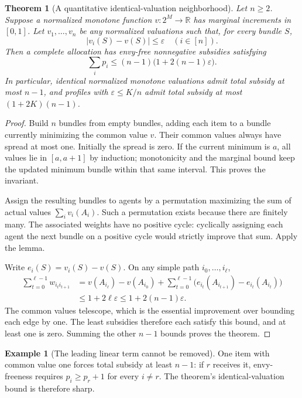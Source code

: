 \documentclass[11pt]{article}
\newtheorem{theorem}{Theorem}
\theoremstyle{definition}
\newtheorem{example}{Example}
\theoremstyle{remark}
\begin{document}
\begin{theorem}[A quantitative identical-valuation neighborhood]
Let $n\geq2$. Suppose a normalized monotone function $v:2^M\to\mathbb R$ has marginal increments in $[0,1]$. Let $v_1,\ldots,v_n$ be any normalized valuations such that, for every bundle $S$,
\[
 |v_i(S)-v(S)|\leq\varepsilon\quad(i\in[n]).
\]
Then a complete allocation has envy-free nonnegative subsidies satisfying
\[
 \sum_i p_i\leq(n-1)\bigl(1+2(n-1)\varepsilon\bigr).
\]
In particular, identical normalized monotone valuations admit total subsidy at most $n-1$, and profiles with $\varepsilon\leq K/n$ admit total subsidy at most $(1+2K)(n-1)$.
\end{theorem}
\begin{proof}
Build $n$ bundles from empty bundles, adding each item to a bundle currently minimizing the common value $v$. Their common values always have spread at most one. Initially the spread is zero. If the current minimum is $a$, all values lie in $[a,a+1]$ by induction; monotonicity and the marginal bound keep the updated minimum bundle within that same interval. This proves the invariant.

Assign the resulting bundles to agents by a permutation maximizing the sum of actual values $\sum_i v_i(A_i)$. Such a permutation exists because there are finitely many. The associated weights have no positive cycle: cyclically assigning each agent the next bundle on a positive cycle would strictly improve that sum. Apply the lemma.

Write $e_i(S)=v_i(S)-v(S)$. On any simple path $i_0,\ldots,i_\ell$,
\begin{align*}
 \sum_{t=0}^{\ell-1}w_{i_t i_{t+1}}
 &=v(A_{i_\ell})-v(A_{i_0})
   +\sum_{t=0}^{\ell-1}\bigl(e_{i_t}(A_{i_{t+1}})-e_{i_t}(A_{i_t})\bigr)\\
 &\leq1+2\ell\varepsilon\leq1+2(n-1)\varepsilon.
\end{align*}
The common values telescope, which is the essential improvement over bounding each edge by one. The least subsidies therefore each satisfy this bound, and at least one is zero. Summing the other $n-1$ bounds proves the theorem.
\end{proof}

\begin{example}[The leading linear term cannot be removed]
One item with common value one forces total subsidy at least $n-1$: if $r$ receives it, envy-freeness requires $p_i\geq p_r+1$ for every $i\neq r$. The theorem's identical-valuation bound is therefore sharp.
\end{example}
\end{document}
